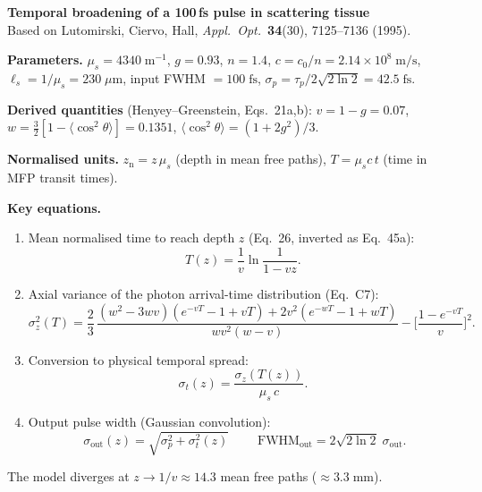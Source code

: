 \documentclass[11pt,a4paper]{article}
\begin{document}
\noindent\textbf{Temporal broadening of a 100\,fs pulse in scattering tissue}\\[4pt]
Based on Lutomirski, Ciervo, Hall, \textit{Appl.\ Opt.}\ \textbf{34}(30), 7125--7136 (1995).

\bigskip\noindent
\textbf{Parameters.}\;
$\mu_s = 4340\;\mathrm{m^{-1}}$,\;
$g = 0.93$,\;
$n = 1.4$,\;
$c = c_0/n = 2.14\times10^8\;\mathrm{m/s}$,\;
$\ell_s = 1/\mu_s = 230\;\mu\mathrm{m}$,\;
input FWHM $= 100\;\mathrm{fs}$,\;
$\sigma_p = \tau_p / 2\sqrt{2\ln 2} = 42.5\;\mathrm{fs}$.

\medskip\noindent
\textbf{Derived quantities} (Henyey--Greenstein, Eqs.~21a,b):\;
$v = 1 - g = 0.07$,\quad
$w = \tfrac{3}{2}[1 - \langle\cos^2\theta\rangle] = 0.1351$,\quad
$\langle\cos^2\theta\rangle = (1+2g^2)/3$.

\medskip\noindent
\textbf{Normalised units.}\;
$z_\mathrm{n} = z\,\mu_s$\; (depth in mean free paths),\quad
$T = \mu_s c\, t$\; (time in MFP transit times).

\bigskip\noindent
\textbf{Key equations.}

\begin{enumerate}
\item Mean normalised time to reach depth $z$ (Eq.~26, inverted as Eq.~45a):
\begin{equation}
  T(z) = \frac{1}{v}\ln\frac{1}{1-vz}.
\end{equation}

\item Axial variance of the photon arrival-time distribution (Eq.~C7):
\begin{equation}
  \sigma_z^2(T) = \frac{2}{3}\,
  \frac{(w^2-3wv)(e^{-vT}-1+vT) + 2v^2(e^{-wT}-1+wT)}{wv^2(w-v)}
  - \biggl[\frac{1-e^{-vT}}{v}\biggr]^2.
\end{equation}

\item Conversion to physical temporal spread:
\begin{equation}
  \sigma_t(z) = \frac{\sigma_z(T(z))}{\mu_s\,c}.
\end{equation}

\item Output pulse width (Gaussian convolution):
\begin{equation}
  \boxed{\;\sigma_\mathrm{out}(z) = \sqrt{\sigma_p^2 + \sigma_t^2(z)}\;}
  \qquad
  \mathrm{FWHM}_\mathrm{out} = 2\sqrt{2\ln 2}\;\sigma_\mathrm{out}.
\end{equation}
\end{enumerate}

\noindent
The model diverges at $z \to 1/v \approx 14.3$ mean free paths ($\approx 3.3\;\mathrm{mm}$).
\end{document}
